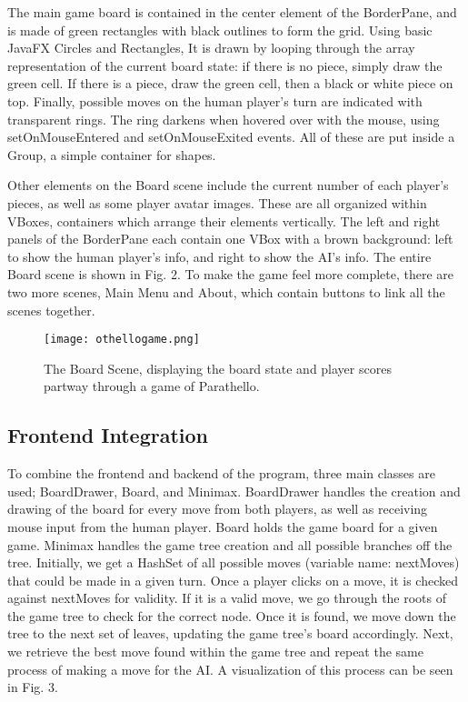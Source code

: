 \documentclass[conference]{IEEEtran}
\begin{document}
The main game board is contained in the center element of the BorderPane, and is made of green rectangles with black outlines to form the grid. Using basic JavaFX Circles and Rectangles, It is drawn by looping through the array representation of the current board state: if there is no piece, simply draw the green cell. If there is a piece, draw the green cell, then a black or white piece on top. Finally, possible moves on the human player’s turn are indicated with transparent rings. The ring darkens when hovered over with the mouse, using setOnMouseEntered and setOnMouseExited events. All of these are put inside a Group, a simple container for shapes.

Other elements on the Board scene include the current number of each player’s pieces, as well as some player avatar images. These are all organized within VBoxes, containers which arrange their elements vertically. The left and right panels of the BorderPane each contain one VBox with a brown background: left to show the human player’s info, and right to show the AI’s info. The entire Board scene is shown in Fig. 2. To make the game feel more complete, there are two more scenes, Main Menu and About, which contain buttons to link all the scenes together.

\begin{figure}[htbp]
\centerline{\texttt{[image: othellogame.png]}}
\caption{The Board Scene, displaying the board state and player scores partway through a game of Parathello.}
\label{fig}
\end{figure}

\subsection{Frontend Integration}
To combine the frontend and backend of the program, three main classes are used; BoardDrawer, Board, and Minimax. BoardDrawer handles the creation and drawing of the board for every move from both players, as well as receiving mouse input from the human player. Board holds the game board for a given game. Minimax handles the game tree creation and all possible branches off the tree. Initially, we get a HashSet of all possible moves (variable name: nextMoves)  that could be made in a given turn. Once a player clicks on a move, it is checked against nextMoves for validity. If it is a valid move, we go through the roots of the game tree to check for the correct node. Once it is found, we move down the tree to the next set of leaves, updating the game tree’s board accordingly. Next, we retrieve the best move found within the game tree and repeat the same process of making a move for the AI. A visualization of this process can be seen in Fig. 3. 
\end{document}

